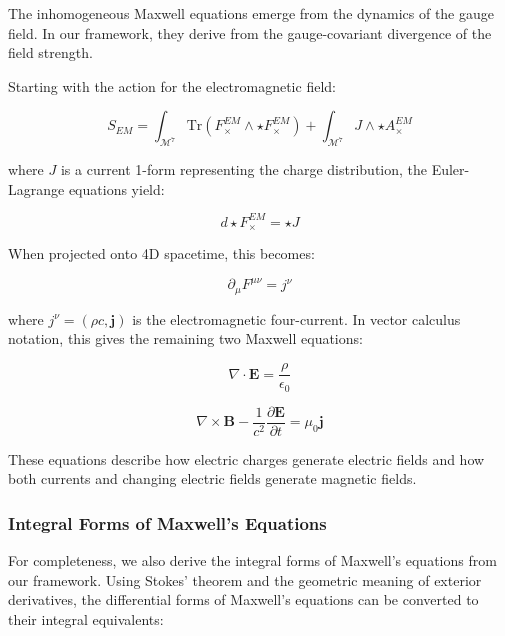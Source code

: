 \documentclass{article}
\begin{document}
The inhomogeneous Maxwell equations emerge from the dynamics of the gauge field. In our framework, they derive from the gauge-covariant divergence of the field strength.

Starting with the action for the electromagnetic field:

\begin{equation}
S_{EM} = \int_{\mathcal{M}^7} \text{Tr}(F^{EM}_{\times} \wedge \star F^{EM}_{\times}) + \int_{\mathcal{M}^7} J \wedge \star A^{EM}_{\times}
\end{equation}

where $J$ is a current 1-form representing the charge distribution, the Euler-Lagrange equations yield:

\begin{equation}
d \star F^{EM}_{\times} = \star J
\end{equation}

When projected onto 4D spacetime, this becomes:

\begin{equation}
\partial_{\mu}F^{\mu\nu} = j^{\nu}
\end{equation}

where $j^{\nu} = (\rho c, \mathbf{j})$ is the electromagnetic four-current. In vector calculus notation, this gives the remaining two Maxwell equations:

\begin{equation}
\nabla \cdot \mathbf{E} = \frac{\rho}{\epsilon_0}
\end{equation}

\begin{equation}
\nabla \times \mathbf{B} - \frac{1}{c^2}\frac{\partial \mathbf{E}}{\partial t} = \mu_0 \mathbf{j}
\end{equation}

These equations describe how electric charges generate electric fields and how both currents and changing electric fields generate magnetic fields.

\subsubsection{Integral Forms of Maxwell's Equations}

For completeness, we also derive the integral forms of Maxwell's equations from our framework. Using Stokes' theorem and the geometric meaning of exterior derivatives, the differential forms of Maxwell's equations can be converted to their integral equivalents:
\end{document}
